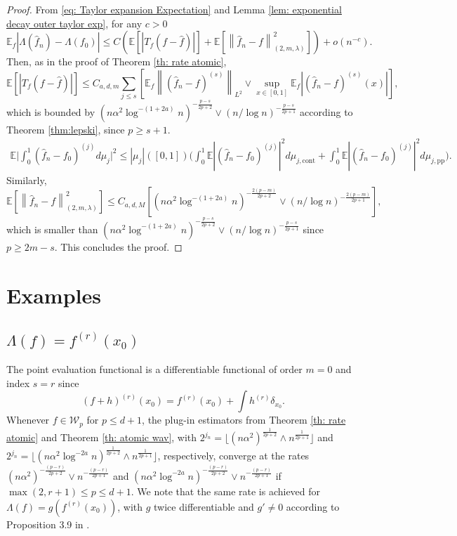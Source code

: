 \documentclass[preprint]{imsart}
\newcommand{\E}{{\mathbb E}}
\newcommand\norm[1]{\left\lVert#1\right\rVert}
\numberwithin{equation}{section}
\begin{document}
\begin{proof}
From \eqref{eq: Taylor expansion Expectation} and Lemma \ref{lem: exponential decay outer taylor exp}, for any $c>0$
\[\E_f|\Lambda(\hat{f}_n)- \Lambda(f_0)|\leq C\left(\mathbb{E}\left[|T_f(f-\hat{f})|\right]+ \mathbb{E}\left[\norm{\hat{f}_n-f}_{(2,m,\lambda)}^2\right]\right)+o(n^{-c}).\]
Then, as in the proof of Theorem \ref{th: rate atomic},
\[\mathbb{E}\left[|T_f(f-\hat{f})|\right]\leq C_{a,d,m} \sum_{j\leq s} \left[\E_f\norm{(\hat{f}_n- f)^{(s)}}_{L^2}\vee \sup_{x\in[0,1]} \E_f\left|(\hat{f}_n-f)^{(s)}(x)\right|\right],\]
which is bounded by $(n\alpha^2\log^{-(1+2a)} n)^{-\frac{p-s}{2p+2}}\vee (n/\log n)^{-\frac{p-s}{2p+1}}$ according to Theorem \ref{thm:lepski}, since $p\geq s+1$.
\begin{align*}
\E \Big| \int_0^1  (\hat{f}_n-f_0)^{(j)}d\mu_j\Big|^2\leq |\mu_j|([0,1])\Big(\int_0^1 \E | (\hat{f}_n-f_0)^{(j)}|^2d\mu_{j,\text{cont}}+ \int_0^1 \E | (\hat{f}_n-f_0)^{(j)}|^2d\mu_{j,\text{pp}}\Big).
\end{align*}
Similarly, 
\[\mathbb{E}\left[\norm{\hat{f}_n-f}_{(2,m,\lambda)}^2\right]\leq C_{a,d,M}\left[(n\alpha^2\log^{-(1+2a)} n)^{-\frac{2(p-m)}{2p+2}}\vee (n/\log n)^{-\frac{2(p-m)}{2p+1}}\right],\]
which is smaller than $(n\alpha^2\log^{-(1+2a)} n)^{-\frac{p-s}{2p+2}}\vee (n/\log n)^{-\frac{p-s}{2p+1}}$ since $p\geq 2m-s$. This concludes the proof.
\end{proof}




\section{Examples}
\label{sec:Examples}

\subsection{$\Lambda(f)=f^{(r)}(x_0)$}

The point evaluation functional is a differentiable functional of order $m=0$ and index $s=r$ since
\[\left(f+h\right)^{(r)}(x_0) = f^{(r)}(x_0) + \int h^{(r)}\delta_{x_0}.\]
Whenever $f\in\mathcal{W}_{p}$ for $p\leq d+1$, the plug-in estimators from Theorem \ref{th: rate atomic} and Theorem \ref{th: atomic wav}, with $2^{j_n} = \lfloor(n\alpha^2)^{\frac{1}{2p+2}}\wedge n^{\frac{1}{2p+1}}\rfloor$ and $2^{j_n} = \lfloor(n\alpha^2\log^{-2a} n)^{\frac{1}{2p+2}}\wedge n^{\frac{1}{2p+1}}\rfloor$, respectively, converge at the rates $(n\alpha^2)^{-\frac{(p-r)}{2p+2}}\vee n^{-\frac{(p-r)}{2p+1}}$ and $(n\alpha^2 \log^{-2a} n)^{-\frac{(p-r)}{2p+2}}\vee n^{-\frac{(p-r)}{2p+1}}$ if $\max(2,r+1)\leq p\leq d+1$. We note that the same rate is achieved for $\Lambda(f)= g(f^{(r)}(x_0))$, with $g$ twice differentiable and $g'\neq 0$ according to Proposition 3.9 in \cite{GoldsteinMesser92}.
\end{document}
